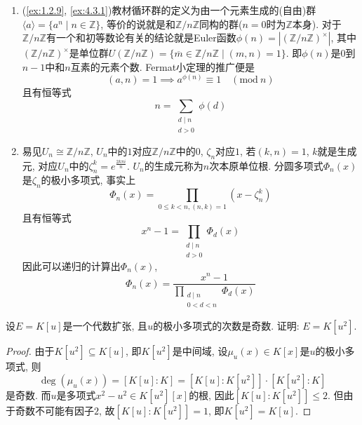 \begin{remark}
    \begin{enumerate}[1.]
        \item (\ref{ex:1.2.9}, \ref{ex:4.3.1})教材循环群的定义为由一个元素生成的(自由)群$\langle a \rangle = \{a^n \mid n \in \mathbb{Z}\}$, 等价的说就是和$\mathbb{Z}/n\mathbb{Z}$同构的群($n = 0$时为$\mathbb{Z}$本身). 对于$\mathbb{Z}/n\mathbb{Z}$有一个和初等数论有关的结论就是Euler函数$\phi(n) = |(\mathbb{Z}/n\mathbb{Z})^\times|$, 其中$(\mathbb{Z}/n\mathbb{Z})^\times$是单位群$U(\mathbb{Z}/n\mathbb{Z}) = \{\overline{m} \in \mathbb{Z}/n\mathbb{Z} \mid (m, n) = 1\}$. 即$\phi(n)$是$0$到$n - 1$中和$n$互素的元素个数. Fermat小定理的推广便是
        \[
            (a, n) = 1 \implies a^{\phi(n)} \equiv 1 \quad (\mathrm{mod}~n)
        \]
        且有恒等式
        \[
            n = \sum_{\substack{d \mid n\\d > 0}} \phi(d)
        \]
        \item 易见$U_n \cong \mathbb{Z}/n\mathbb{Z}$, $U_n$中的$1$对应$\mathbb{Z}/n\mathbb{Z}$中的$0$, $\zeta_n$对应$1$, 若$(k, n) = 1$, $k$就是生成元, 对应$U_n$中的$\zeta_n^k = e^{\frac{2k\pi i}{n}}$. $U_n$的生成元称为$n$次本原单位根. 分圆多项式$\Phi_n(x)$是$\zeta_n$的极小多项式, 事实上
        \[
            \Phi_n(x) = \prod_{0 \leqslant k < n, (n, k) = 1} (x - \zeta_n^k)
        \]
        且有恒等式
        \[
            x^n - 1 = \prod_{\substack{d \mid n\\d > 0}} \Phi_d(x)
        \]
        因此可以递归的计算出$\Phi_n(x)$,
        \[
            \Phi_n(x) = \frac{x^n - 1}{\displaystyle\prod_{\substack{d \mid n\\0 < d < n}} \Phi_d(x)} 
        \]
    \end{enumerate}    
\end{remark}

\begin{problem}\label{ex:3.1.7}
    设$E = K[u]$是一个代数扩张, 且$u$的极小多项式的次数是奇数. 证明: $E = K[u^2]$.
\end{problem}

\begin{proof}
    由于$K[u^2] \subseteq K[u]$, 即$K[u^2]$是中间域, 设$\mu_u(x) \in K[x]$是$u$的极小多项式, 则
    \[
        \deg(\mu_u(x)) = \left[K[u]:K\right] = \left[K[u]:K[u^2]\right] \cdot \left[K[u^2]:K\right]
    \]
    是奇数. 而$u$是多项式$x^2 - u^2 \in K[u^2][x]$的根, 因此$\left[K[u]:K[u^2]\right] \leqslant 2$. 但由于奇数不可能有因子$2$, 故$\left[K[u]:K[u^2]\right] = 1$, 即$K[u^2] = K[u]$.
\end{proof}

